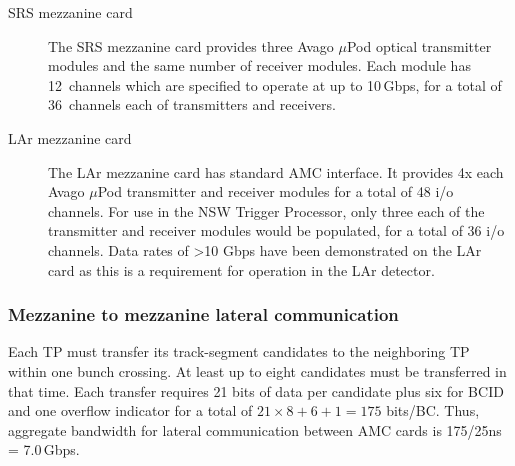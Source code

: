 \begin{description}
\item[SRS mezzanine card]
The SRS mezzanine card provides three Avago $\mu$Pod optical transmitter modules and
the same number of receiver modules. Each module has 12~channels which
are specified to operate at up to 10\,Gbps, for a total of 36~channels
each of transmitters and receivers.

\item[LAr mezzanine card]
The LAr mezzanine card has standard AMC interface.
It provides 4x each Avago $\mu$Pod transmitter and receiver
modules for a total of 48 i/o channels. For use in the NSW Trigger
Processor, only three each of the transmitter and receiver modules would
be populated, for a total of 36 i/o channels. Data rates of
\textgreater{}10 Gbps have been demonstrated on the LAr card as this is
a requirement for operation in the LAr detector.
\end{description}


\subsubsection{Mezzanine to mezzanine lateral communication}
\label{amc-to-amc-lateral-communication}

Each \MM TP must transfer its track-segment candidates to the neighboring \stgc TP
within one bunch crossing. At least up to eight candidates must be transferred in that time.
Each transfer requires 21 bits of data per candidate plus six for BCID and one overflow indicator
for a total of $21\times8 + 6 +1 = 175$ bits/BC. Thus, aggregate bandwidth for lateral communication between AMC cards is 175/25ns = 7.0\,Gbps.

